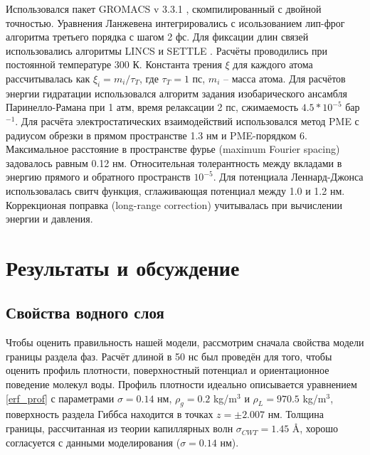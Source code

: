 Использовался пакет GROMACS  v 3.3.1 \cite{gromacs}, скомпилированный с двойной точностью. Уравнения Ланжевена интегрировались с исользованием лип-фрог алгоритма третьего порядка \cite{leap_frog_lang_gunsteren_1988} с шагом 2 фс. Для фиксации длин связей использовались алгоритмы  LINCS \cite{lincs} и SETTLE \cite{settle}. Расчёты проводились при постоянной температуре 300 К.
Константа трения $\xi$ для каждого атома рассчитывалась как $\xi_i=m_i/\tau_T$, где $\tau_T=1$ пс, $m_i$ -- масса атома. Для расчётов энергии гидратации использовался алгоритм задания изобарического ансамбля Паринелло-Рамана \cite{barostat} при 1 атм, время релаксации 2 пс, сжимаемость $4.5*10^{-5}$ бар$^{-1}$.  
Для расчёта электростатических взаимодействий использовался метод PME \cite{pme,pme2} с радиусом обрезки в прямом пространстве 1.3 нм и PME-порядком 6. Максимальное расстояние в пространстве фурье (maximum Fourier spacing) задовалось равным 0.12 нм.
Относительная толерантность между вкладами в энергию прямого и обратного пространств $10^{-5}$. Для потенциала Леннард-Джонса использовалась свитч функция, сглаживающая потенциал между 1.0 и 1.2 нм. Коррекционая поправка  (long-range correction) учитывалась при вычислении энергии и давления.

\section{Результаты и обсуждение}

\subsection{\label{sec:wat_res}Свойства водного слоя}
Чтобы оценить правильность нашей модели, рассмотрим сначала свойства модели границы раздела фаз. Расчёт длиной в 50 нс был проведён для того, чтобы оценить профиль плотности, поверхностный потенциал и ориентационное поведение молекул воды.
Профиль плотности идеально описывается уравнением \ref{erf_prof} с параметрами $ \sigma=0.14 $ нм,
 $ \rho_g=0.2 $ kg/m$^3$ и $ \rho_L=970.5 $ kg/m$^3$, поверхность раздела Гиббса находится в точках $z=\pm2.007$ нм. Толщина границы, рассчитанная из теории капиллярных волн  $\sigma_{CWT}=1.45$ \AA, хорошо согласуется с данными моделирования ($ \sigma=0.14 $ нм).



